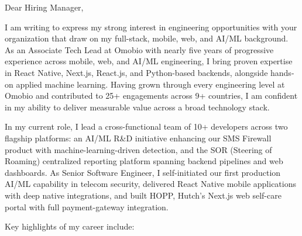\documentclass[11pt]{article}
\begin{document}

Dear Hiring Manager,

I am writing to express my strong interest in engineering opportunities with your organization that draw on my full-stack, mobile, web, and AI/ML background. As an Associate Tech Lead at Omobio with nearly five years of progressive experience across mobile, web, and AI/ML engineering, I bring proven expertise in React Native, Next.js, React.js, and Python-based backends, alongside hands-on applied machine learning. Having grown through every engineering level at Omobio and contributed to 25+ engagements across 9+ countries, I am confident in my ability to deliver measurable value across a broad technology stack.

In my current role, I lead a cross-functional team of 10+ developers across two flagship platforms: an AI/ML R\&D initiative enhancing our SMS Firewall product with machine-learning-driven detection, and the SOR (Steering of Roaming) centralized reporting platform spanning backend pipelines and web dashboards. As Senior Software Engineer, I self-initiated our first production AI/ML capability in telecom security, delivered React Native mobile applications with deep native integrations, and built HOPP, Hutch's Next.js web self-care portal with full payment-gateway integration.

Key highlights of my career include:

\begin{clitems}
  \item {}
  \item {}
  \item {}
  \item {}
\end{clitems}
\end{document}
